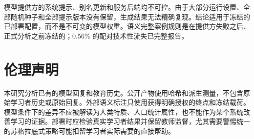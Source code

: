 \documentclass[11pt,a4paper,UTF8]{ctexart}
\begin{document}
模型提供方的系统提示、别名更新和服务后端均不可控。由于大部分运行设置、全部随机种子和全部提示版本没有保留，生成结果无法精确复现。结论适用于冻结的已部署配置，而不是不可变的模型权重。语义完整案例规则是在提供方失败之后、正式分析之前冻结的；0.56\% 的配对技术性流失已完整报告。

\section*{伦理声明}

本研究分析已有的模型回复和教育历史。公开产物使用哈希和派生测量，不包含原始学习者历史或原始回复。外部语义标注只使用获得明确授权的终点和冻结载荷。模型条件下的差异不应被解读为人类特质、人口统计属性，也不能作为某个系统改善学习的证据。部署时应检验真实学习者结果并保留教师监督，尤其需要警惕统一的苏格拉底式策略可能扣留学习者实际需要的直接帮助。



\end{document}

